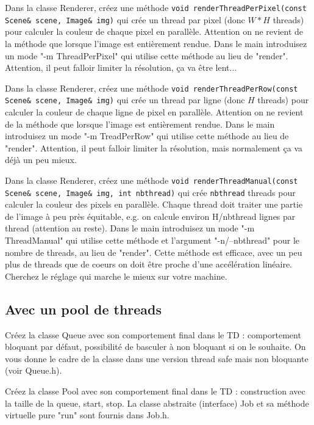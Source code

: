 \question Dans la classe Renderer, créez une méthode \texttt{void renderThreadPerPixel(const Scene& scene, Image& img)} 
qui crée un thread par pixel (donc $W*H$ threads) pour calculer la couleur de chaque pixel en parallèle.
Attention on ne revient de la méthode que lorsque l'image est entièrement rendue.
Dans le main introduisez un mode "-m ThreadPerPixel"  qui utilise cette méthode au lieu de "render".
Attention, il peut falloir limiter la résolution, ça va être lent... 

\question Dans la classe Renderer, créez une méthode \texttt{void renderThreadPerRow(const Scene& scene, Image& img)} 
qui crée un thread par ligne (donc $H$ threads) pour calculer la couleur de chaque ligne de pixel en parallèle.
Attention on ne revient de la méthode que lorsque l'image est entièrement rendue.
Dans le main introduisez un mode "-m TreadPerRow" qui utilise cette méthode au lieu de "render".
Attention, il peut falloir limiter la résolution, mais normalement ça va déjà un peu mieux.

\question Dans la classe Renderer, créez une méthode \texttt{void renderThreadManual(const Scene& scene, Image& img, int nbthread)}
qui crée \texttt{nbthread} threads pour calculer la couleur des pixels en parallèle.
Chaque thread doit traiter une partie de l'image à peu près équitable, e.g. on calcule environ H/nbthread lignes par thread (attention au reste).
Dans le main introduisez un mode "-m ThreadManual" qui utilise cette méthode et l'argument "-n/--nbthread" pour le nombre de threads, 
au lieu de "render".
Cette méthode est efficace, avec un peu plus de threads que de coeurs on doit être proche d'une accélération linéaire.
Cherchez le réglage qui marche le mieux sur votre machine.

\subsection{Avec un pool de threads}

\question Créez la classe Queue avec son comportement final dans le TD : comportement bloquant par défaut, possibilité de basculer à non bloquant si on le souhaite.
On vous donne le cadre de la classe dans une version thread safe mais non bloquante (voir Queue.h).

\question Créez la classe Pool avec son comportement final dans le TD : 
construction avec la taille de la queue, start, stop. La classe abstraite (interface) Job et sa méthode virtuelle pure "run" sont fournis dans Job.h.

